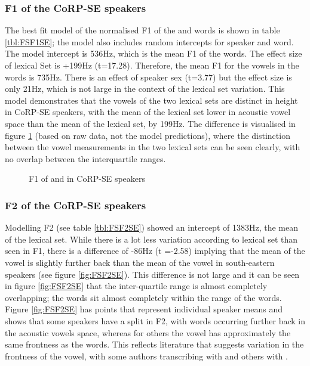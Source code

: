 \documentclass[../../../00.FullDoc/tex/APRReport-year4]{subfiles}
\begin{document}
\subsubsection{F1 of the CoRP-SE speakers} \label{subsubsec:SEF1}
The best fit model of the normalised F1 of the \foot{}  and \strutt{}  words is shown in table \ref{tbl:FSF1SE}; the model also includes random intercepts for speaker and word. The model intercept is 536Hz, which is the mean F1 of the \foot{} words. The effect size of lexical Set is +199Hz (t=17.28). Therefore, the mean F1 for the vowels in the \strutt{} words is 735Hz. There is an effect of speaker sex (t=3.77) but the effect size is only 21Hz, which is not large in the context of the lexical set variation. This model demonstrates that the vowels of the two lexical sets are distinct in height in CoRP-SE speakers, with the mean of the \strutt{} lexical set lower in acoustic vowel space than the mean of the \foot{} lexical set, by 199Hz. The difference is visualised in figure \ref{fig:FSF1SE} (based on raw data, not the model predictions), where the distinction between the vowel measurements in the two lexical sets can be seen clearly, with no overlap between the interquartile ranges.



\begin{figure}[h]
	\centering
	
	\caption{F1 of \foot{} and \strutt{} in CoRP-SE speakers} \label{fig:FSF1SE}
\end{figure}

\subsubsection{F2 of the CoRP-SE speakers} \label{subsubsec:SEF2}
Modelling F2 (see table \ref{tbl:FSF2SE}) showed an intercept of 1383Hz, the mean of the \foot{} lexical set. While there is a lot less variation according to lexical set than seen in F1, there is a difference of -86Hz (t =-2.58) implying that the mean of the \strutt{} vowel is slightly further back than the mean of the \foot{} vowel in south-eastern speakers (see figure \ref{fig:FSF2SE}). This difference is not large and it can be seen in figure \ref{fig:FSF2SE} that the inter-quartile range is almost completely overlapping; the \strutt{} words sit almost completely within the range of the \foot{} words. Figure \ref{fig:FSF2SE} has points that represent individual speaker means and shows that some speakers have a split in F2, with \strutt{} words occurring further back in the acoustic vowels space, whereas for others the \strutt{} vowel has approximately the same frontness as the \foot{} words. This reflects literature that suggests variation in the frontness of the \strutt{} vowel, with some authors transcribing with \textturna{} and others with \textturnv{}.
\end{document}
